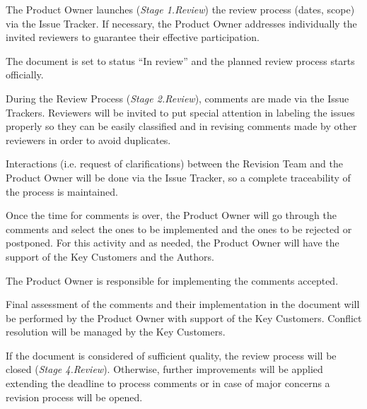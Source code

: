 \documentclass{template/openetcs_article}
\begin{document}
The Product Owner launches ({\it Stage 1.Review}) the review process (dates, scope) via the Issue Tracker. If necessary, the Product Owner addresses individually the invited reviewers to guarantee their effective participation.

The document is set to status “In review” and the planned review process starts officially.

During the Review Process ({\it Stage 2.Review}), comments are made via the Issue Trackers. Reviewers will be invited to put special attention in labeling the issues properly so they can be easily classified and in revising comments made by other reviewers in order to avoid duplicates.

Interactions (i.e. request of clarifications) between the Revision Team and the Product Owner will be done via the Issue Tracker, so a complete traceability of the process is maintained.

Once the time for comments is over, the Product Owner will go through the comments and select the ones to be implemented and the ones to be rejected or postponed. For this activity and as needed, the Product Owner will have the support of the Key Customers and the Authors.

The Product Owner is responsible for implementing the comments accepted.

Final assessment of the comments and their implementation in the document will be performed by the Product Owner with support of the Key Customers. Conflict resolution will be managed by the Key Customers.

If the document is considered of sufficient quality, the review process will be closed ({\it Stage 4.Review}). Otherwise, further improvements will be applied extending the deadline to process comments or in case of major concerns a revision process will be opened. 
\end{document}
